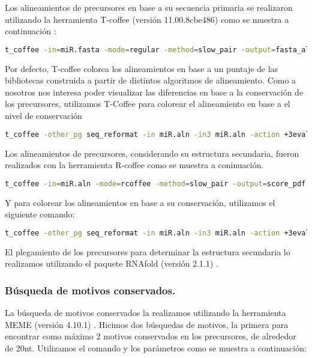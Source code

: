 Los alineamientos de precursores en base a su secuencia primaria se realizaron utilizando la herramienta T-coffee (versión 11.00.8cbe486) \citep{pmid10964570} como se muestra a continuación :

\begin{lstlisting}[language=bash]
t_coffee -in=miR.fasta -mode=regular -method=slow_pair -output=fasta_aln -quiet=stdout -out=miR.aln
\end{lstlisting}

Por defecto, T-coffee colorea los alineamientos en base a un puntaje de las bibliotecas construida a partir de distintos algoritmos de alineamiento.
Como a nosotros nos interesa poder visualizar las diferencias en base a la conservación de los precursores, utilizamos T-Coffee para colorear el alineamiento en base a el nivel de conservación

\begin{lstlisting}[language=bash]
t_coffee -other_pg seq_reformat -in miR.aln -in3 miR.aln -action +3evaluate idmat -out=miR_T_Coffee.pdf
\end{lstlisting}

Los alineamientos de precursores, considerando su estructura secundaria, fueron realizados con la herramienta R-coffee \citep{pmid18292307} como se muestra a coninuación.

\begin{lstlisting}[language=bash]
t_coffee -in=miR.aln -mode=rcoffee -method=slow_pair -output=score_pdf score_ascii -run_name=miR_R_Coffee
\end{lstlisting}

Y para colorear los alineamientos en base a su conservación, utilizamos el siguiente comando:

\begin{lstlisting}[language=bash]
t_coffee -other_pg seq_reformat -in miR.aln -in3 miR.aln -action +3evaluate idmat -out= miR.aln_R_Coffee.pdf
\end{lstlisting}

El plegamiento de los precursores para determinar la estructura secundaria lo realizamos utilizando el paquete RNAfold (versión 2.1.1) \citep{pmid22115189}.

\subsubsection{Búsqueda de motivos conservados.} \label{sec:meme}
La búsqueda de motivos conservados la realizamos utilizando la herramienta MEME (versión 4.10.1) \citep{pmid7584402}.
Hicimos dos búsquedas de motivos, la primera para encontrar como máximo 2 motivos conservados en los precursores, de alrededor de 20nt.
Utilizamos el comando y los parámetros como se muestra a continuación:

